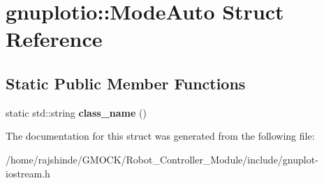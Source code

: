 \hypertarget{structgnuplotio_1_1_mode_auto}{}\section{gnuplotio\+:\+:Mode\+Auto Struct Reference}
\label{structgnuplotio_1_1_mode_auto}
\subsection*{Static Public Member Functions}
\begin{DoxyCompactItemize}
\item 
static std\+::string {\bfseries class\+\_\+name} ()\hypertarget{structgnuplotio_1_1_mode_auto_ac73f89a782ac32dd8bc7b8f7a7581523}{}\label{structgnuplotio_1_1_mode_auto_ac73f89a782ac32dd8bc7b8f7a7581523}

\end{DoxyCompactItemize}


The documentation for this struct was generated from the following file\+:\begin{DoxyCompactItemize}
\item 
/home/rajshinde/\+G\+M\+O\+C\+K/\+Robot\+\_\+\+Controller\+\_\+\+Module/include/gnuplot-\/iostream.\+h\end{DoxyCompactItemize}
